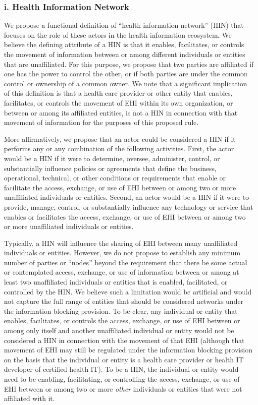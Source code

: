 \documentclass[twoside,11pt]{article}
\begin{document}
          \subsubsection{i. Health Information Network}

          We propose a functional definition of “health information network” (HIN) that focuses on the role of these actors in the health information ecosystem. We believe the defining attribute of a HIN is that it enables, facilitates, or controls the movement of information between or among different individuals or entities that are unaffiliated. For this purpose, we propose that two parties are affiliated if one has the power to control the other, or if both parties are under the common control or ownership of a common owner. We note that a significant implication of this definition is that a health care provider or other entity that enables, facilitates, or controls the movement of EHI within its own organization, or between or among its affiliated entities, is not a HIN in connection with that movement of information for the purposes of this proposed rule.


          More affirmatively, we propose that an actor could be considered a HIN if it performs any or any combination of the following activities. First, the actor would be a HIN if it were to determine, oversee, administer, control, or substantially influence policies or agreements that define the business, operational, technical, or other conditions or requirements that enable or facilitate the access, exchange, or use of EHI between or among two or more unaffiliated individuals or entities. Second, an actor would be a HIN if it were to provide, manage, control, or substantially influence any technology or service that enables or facilitates the access, exchange, or use of EHI between or among two or more unaffiliated individuals or entities.



          Typically, a HIN will influence the sharing of EHI between many unaffiliated individuals or entities. However, we do not propose to establish any minimum number of parties or “nodes” beyond the requirement that there be some actual or contemplated access, exchange, or use of information between or among at least two unaffiliated individuals or entities that is enabled, facilitated, or controlled by the HIN. We believe such a limitation would be artificial and would not capture the full range of entities that should be considered networks under the information blocking provision. To be clear, any individual or entity that enables, facilitates, or controls the access, exchange, or use of EHI between or among only itself and another unaffiliated individual or entity would not be considered a HIN in connection with the movement of that EHI (although that movement of EHI may still be regulated under the information blocking provision on the basis that the individual or entity is a health care provider or health IT developer of certified health IT). To be a HIN, the individual or entity would need to be enabling, facilitating, or controlling the access, exchange, or use of EHI between or among two or more \emph{other} individuals or entities that were not affiliated with it.
\end{document}
